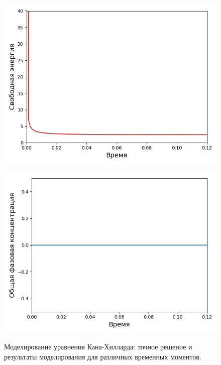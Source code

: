 \begin{figure}[t!]
    \begin{minipage}{0.49\linewidth}
        \includegraphics[width=\linewidth]{images/data_energ.png}
        \label{fig:modeling_KH:3}
    \end{minipage}
    \hfill
    \begin{minipage}{0.49\linewidth}
        \includegraphics[width=\linewidth]{images/phase_balance.png}
        \label{fig:modeling_KH:4}
    \end{minipage}
    
    \caption{Моделирование уравнения Кана-Хилларда: точное решение и результаты моделирования для различных временных моментов.}
    \label{fig:modeling_KH}
\end{figure}

